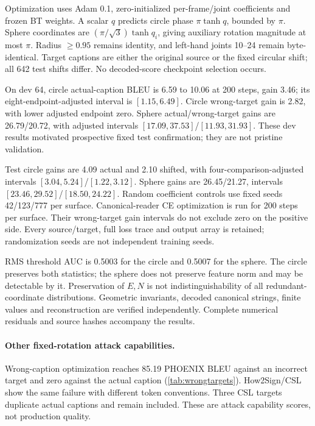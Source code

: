 \documentclass[10pt,twocolumn,letterpaper]{article}
\begin{document}
Optimization uses Adam 0.1, zero-initialized per-frame/joint coefficients and frozen BT weights. A scalar $q$ predicts circle phase $\pi\tanh q$, bounded by $\pi$. Sphere coordinates are $(\pi/\sqrt 3)\tanh q_i$, giving auxiliary rotation magnitude at most $\pi$. Radius $\ge 0.95$ remains identity, and left-hand joints 10--24 remain byte-identical. Target captions are either the original source or the fixed circular shift; all 642 test shifts differ. No decoded-score checkpoint selection occurs.



On dev 64, circle actual-caption BLEU is 6.59 to 10.06 at 200 steps, gain 3.46; its eight-endpoint-adjusted interval is $[1.15,6.49]$. Circle wrong-target gain is 2.82, with lower adjusted endpoint zero. Sphere actual/wrong-target gains are 26.79/20.72, with adjusted intervals $[17.09,37.53]$/$[11.93,31.93]$. These dev results motivated prospective fixed test confirmation; they are not pristine validation.

Test circle gains are 4.09 actual and 2.10 shifted, with four-comparison-adjusted intervals $[3.04,5.24]$/$[1.22,3.12]$. Sphere gains are 26.45/21.27, intervals $[23.46,29.52]$/$[18.50,24.22]$. Random coefficient controls use fixed seeds 42/123/777 per surface. Canonical-reader CE optimization is run for 200 steps per surface. Their wrong-target gain intervals do not exclude zero on the positive side. Every source/target, full loss trace and output array is retained; randomization seeds are not independent training seeds.

RMS threshold AUC is 0.5003 for the circle and 0.5007 for the sphere. The circle preserves both statistics; the sphere does not preserve feature norm and may be detectable by it. Preservation of $E,N$ is not indistinguishability of all redundant-coordinate distributions. Geometric invariants, decoded canonical strings, finite values and reconstruction are verified independently. Complete numerical residuals and source hashes accompany the results.

\paragraph{Other fixed-rotation attack capabilities.}

Wrong-caption optimization reaches 85.19 PHOENIX BLEU against an incorrect target and zero against the actual caption (\cref{tab:wrongtargets}). How2Sign/CSL show the same failure with different token conventions. Three CSL targets duplicate actual captions and remain included. These are attack capability scores, not production quality.
\end{document}
